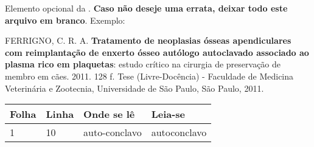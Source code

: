 \begin{errata}
  Elemento opcional da . \textbf{Caso não
    deseje uma errata, deixar todo este arquivo em branco}. Exemplo:

  \vspace{\onelineskip}

  FERRIGNO, C. R. A. \textbf{Tratamento de neoplasias ósseas apendiculares com
    reimplantação de enxerto ósseo autólogo autoclavado associado ao plasma rico em
    plaquetas}: estudo crítico na cirurgia de preservação de membro em cães. 2011.
  128 f. Tese (Livre-Docência) - Faculdade de Medicina Veterinária e Zootecnia,
  Universidade de São Paulo, São Paulo, 2011.

  \begin{table}[htb]
    \center
    \footnotesize
    \begin{tabular}{|p{1.4cm}|p{1cm}|p{3cm}|p{3cm}|}
      \hline
      \textbf{Folha} & \textbf{Linha} & \textbf{Onde se lê} & \textbf{Leia-se} \\
      \hline
      1              & 10             & auto-conclavo       & autoconclavo     \\
      \hline
    \end{tabular}
  \end{table}

\end{errata}
